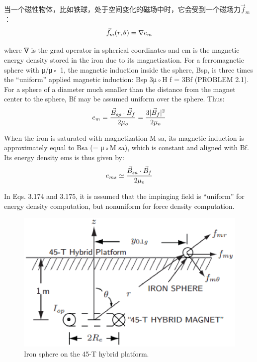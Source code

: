 当一个磁性物体，比如铁球，处于空间变化的磁场中时，它会受到一个磁场力$\vec{f}_m$：
\begin{equation}
\vec{f}_{m}(r,\theta)=\nabla e_{m}\\%
\end{equation}

where ∇ is the grad operator in spherical coordinates and em is the magnetic
energy density stored in the iron due to its magnetization. For a ferromagnetic
sphere with μ/μ◦  1, the magnetic induction inside the sphere, Bsp, is three times
the “uniform” applied magnetic induction: Bsp  3μ◦H f = 3Bf (PROBLEM 2.1).
For a sphere of a diameter much smaller than the distance from the magnet center
to the sphere, Bf may be assumed uniform over the sphere. Thus:
\begin{equation}
e_{m}=\frac{\vec{B}_{sp}\cdot\vec{B}_{f}}{2\mu_{o}}=\frac{3|\vec{B}_{f}|^{2}}{2\mu_{o}}\\%
\end{equation}

When the iron is saturated with magnetization M sa, its magnetic induction is
approximately equal to Bsa (= μ◦M sa), which is constant and aligned with Bf.
Its energy density ems is thus given by:
\begin{equation}
e_{ms}\simeq\frac{\vec{B}_{sa}\cdot\vec{B}_{f}}{2\mu_{o}}\\%
\end{equation}

In Eqs. 3.174 and 3.175, it is assumed that the impinging field is “uniform” for
energy density computation, but nonuniform for force density computation.

\begin{figure}[htbp]
	\centering
	\includegraphics[scale=0.5]{chpt3/figs/fig3.46.eps}
	\caption{Iron sphere on the 45-T hybrid platform.}
\end{figure}

